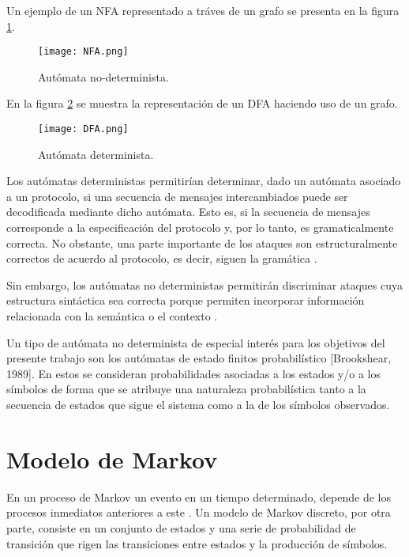 Un ejemplo de un NFA representado a tráves de un grafo se presenta en la figura \ref{fig:NFA}.

\begin{figure}[tb]
\begin{center}
\texttt{[image: NFA.png]}
\caption{Autómata no-determinista.\cite{automataFinito}}
\label{fig:NFA}
\end{center}
\end{figure}

En la figura \ref{fig:DFA} se muestra la representación de un DFA haciendo uso de un grafo.

\begin{figure}[tb]
\begin{center}
\texttt{[image: DFA.png]}
\caption{Autómata determinista.\cite{automataFinito}}
\label{fig:DFA}
\end{center}
\end{figure}

Los autómatas deterministas permitirían determinar, dado un autómata asociado a un protocolo, si una secuencia de mensajes intercambiados puede ser decodificada mediante dicho autómata. Esto es, si la secuencia de mensajes corresponde a la especificación del protocolo y, por lo tanto, es gramaticalmente correcta. No obstante, una parte importante de los ataques son estructuralmente correctos de acuerdo al protocolo, es decir, siguen la gramática \cite{tesisMexico}.

Sin embargo, los autómatas no deterministas permitirán discriminar ataques cuya estructura sintáctica sea correcta porque permiten incorporar información relacionada con la semántica o el contexto .

Un tipo de autómata no determinista de especial interés para los objetivos del presente trabajo son los autómatas de estado finitos probabilístico [Brookshear, 1989]. En estos se consideran probabilidades asociadas a los estados y/o a los símbolos de forma que se atribuye una naturaleza probabilística tanto a la secuencia de estados que sigue el sistema como a la de los símbolos observados.


\section{Modelo de Markov}

En un proceso de Markov un evento en un tiempo determinado, depende de los procesos inmediatos anteriores a este \cite{markov}. Un modelo de Markov discreto, por otra parte, consiste en un conjunto de estados y una serie de probabilidad de transición que rigen las transiciones entre estados y la producción de símbolos.

